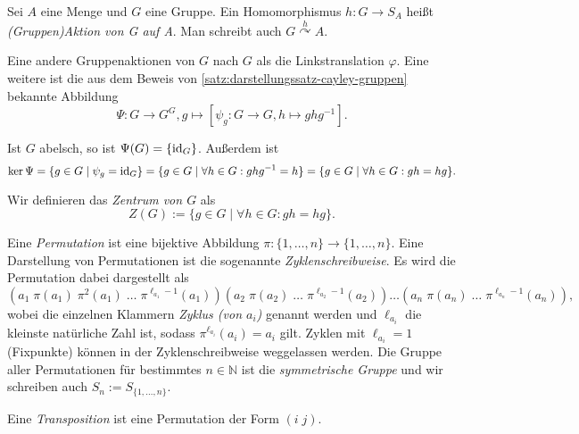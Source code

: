 \begin{definition}
    Sei $A$ eine Menge und $G$ eine Gruppe. Ein Homomorphismus $h: G \to S_A$ heißt \emph{(Gruppen)Aktion von G auf A}. Man schreibt auch $G \overset{h}{\curvearrowright} A$.
\end{definition}

\begin{remark}
   Eine andere Gruppenaktionen von $G$ nach $G$ als die Linkstranslation $\varphi$. Eine weitere ist die aus dem Beweis von \cref{satz:darstellungssatz-cayley-gruppen} bekannte Abbildung
   \begin{equation*}
        \Psi: G \to G^G, g \mapsto [\psi_g: G \to G, h \mapsto ghg^{-1}]. \tag*{(Konjugation)}
   \end{equation*}

   Ist $G$ abelsch, so ist $\Psi(G) = \{\operatorname{id}_G\}$. Außerdem ist 
   $$ \ker \Psi = \{g \in G \mid \psi_g = \operatorname{id}_G\} = \{g \in G \mid \forall h \in G: ghg^{-1} = h\} = \{g \in G \mid \forall h \in G: gh = hg\}. $$

   Wir definieren das \emph{Zentrum von $G$} als
   $$ Z(G) := \{ g \in G \mid \forall h \in G: gh = hg\}. $$ 
\end{remark}

\begin{definition}
    Eine \emph{Permutation} ist eine bijektive Abbildung $\pi: \{1, \ldots, n\} \to \{1, \ldots, n\}$. Eine Darstellung von Permutationen ist die sogenannte \emph{Zyklenschreibweise}. Es wird die Permutation dabei dargestellt als
    $$ (a_1\; \pi(a_1)\; \pi^2(a_1)\; \ldots \; \pi^{\ell_{a_1} - 1}(a_1)) (a_2\; \pi(a_2)\; \ldots \; \pi^{\ell_{a_2} - 1}(a_2)) \ldots (a_n\; \pi(a_n)\; \ldots \; \pi^{\ell_{a_n} - 1}(a_n)),$$
    wobei die einzelnen Klammern \emph{Zyklus (von $a_i$)} genannt werden und $\ell_{a_i}$ die kleinste natürliche Zahl ist, sodass $\pi^{\ell_{a_i}}(a_i) = a_i$ gilt. Zyklen mit $\ell_{a_i} = 1$ (Fixpunkte) können in der Zyklenschreibweise weggelassen werden.
    Die Gruppe aller Permutationen für bestimmtes $n \in \mathbb{N}$ ist die \emph{symmetrische Gruppe} und wir schreiben auch $S_n := S_{\{1,\ldots, n\}}$.

    Eine \emph{Transposition} ist eine Permutation der Form $(i\; j)$.
\end{definition}

